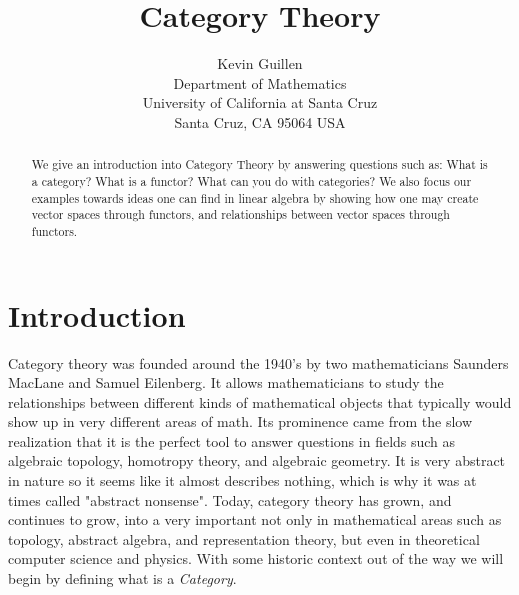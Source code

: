 \documentclass[12pt]{article}
\theoremstyle{definition}
\theoremstyle{remark}
\begin{document}



\title{Category Theory}

\author{Kevin Guillen \\ 
Department of Mathematics \\
University of California at Santa Cruz \\
Santa Cruz, CA 95064 USA}

\maketitle

\begin{abstract}
    We give an introduction into Category Theory by answering questions such as: What is a category? What is a functor? What can you do with categories? We also focus our examples towards ideas one can find in linear algebra by showing how one may create vector spaces through functors, and relationships between vector spaces through functors. 
\end{abstract}

\section{Introduction}

Category theory was founded around the 1940's by two mathematicians Saunders MacLane and Samuel Eilenberg. It allows mathematicians to study the relationships between different kinds of mathematical objects that typically would show up in very different areas of math. Its prominence came from the slow realization that it is the perfect tool to answer questions in fields such as algebraic topology, homotropy theory, and algebraic geometry. It is very abstract in nature so it seems like it almost describes nothing, which is why it was at times called "abstract nonsense". Today, category theory has grown, and continues to grow, into a very important not only in mathematical areas such as topology, abstract algebra, and representation theory, but even in theoretical computer science and physics. With some historic context out of the way we will begin by defining what is a \textit{Category}.
\end{document}
